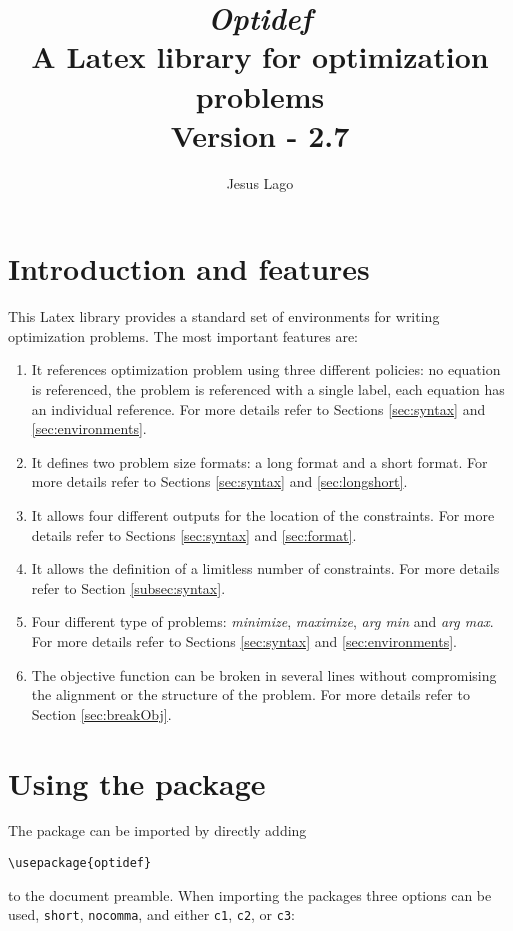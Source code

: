 \documentclass[a4paper]{article}
\title{\textit{\textbf{Optidef}} \\ A Latex library for optimization problems\\ \textnormal{Version - 2.7}}
\author{Jesus Lago}
\begin{document}
\maketitle

\newpage

\tableofcontents

\newpage

\section{Introduction and features}

This Latex library provides a standard set of environments for writing optimization problems. The most important features are:
\begin{enumerate}
\item It references optimization problem using three different policies: no equation is referenced, the problem is referenced with a single label, each equation has an individual reference. For more details refer to Sections \ref{sec:syntax} and \ref{sec:environments}.
\item It defines two problem size formats: a long format and a short format. For more details refer to Sections \ref{sec:syntax} and \ref{sec:longshort}.
\item It allows four different outputs for the location of the constraints. For more details refer to Sections \ref{sec:syntax} and \ref{sec:format}.
\item It allows the definition of a limitless number of constraints. For more details refer to Section \ref{subsec:syntax}.
\item Four different type of problems: \textit{minimize}, \textit{maximize}, \textit{arg min} and \textit{arg max}. For more details refer to Sections \ref{sec:syntax} and \ref{sec:environments}.
\item The objective function can be broken in several lines without compromising the alignment or the structure of the problem. For more details refer to Section \ref{sec:breakObj}.
\end{enumerate}

\section{Using the package}
The package can be imported by directly adding
\begin{lstlisting}
\usepackage{optidef}
\end{lstlisting}
to the document preamble. When importing the packages three options can be used, \verb|short|, \verb|nocomma|, and either \verb|c1|, \verb|c2|, or \verb|c3|:
\end{document}
